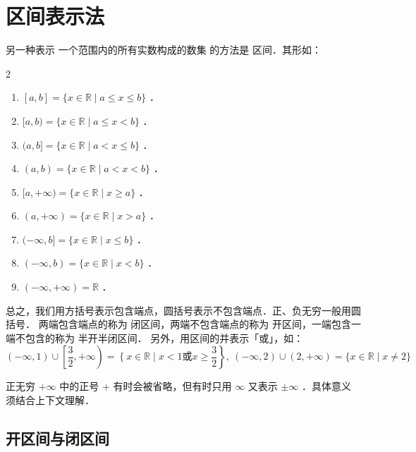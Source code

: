 \section{区间表示法}

\begin{definition}[区间]
    另一种表示 一个范围内的所有实数构成的数集 的方法是 区间．其形如：
    \begin{multicols}{2}
        \begin{enumerate}
            \item $[a, b]=\{x \in \mathbb{R} \mid a \leq x \leq b\}$ ．
            \item $[a, b)=\{x \in \mathbb{R} \mid a \leq x<b\}$ ．
            \item $(a, b]=\{x \in \mathbb{R} \mid a<x \leq b\}$ ．
            \item $(a, b)=\{x \in \mathbb{R} \mid a<x<b\}$ ．
            \item $[a,+\infty)=\{x \in \mathbb{R} \mid x \geq a\}$ ．
            \item $(a,+\infty)=\{x \in \mathbb{R} \mid x>a\}$ ．
            \item $(-\infty, b]=\{x \in \mathbb{R} \mid x \leq b\}$ ．
            \item $(-\infty, b)=\{x \in \mathbb{R} \mid x<b\}$ ．
            \item $(-\infty,+\infty)=\mathbb{R}$ ．
        \end{enumerate}
    \end{multicols}

    总之，我们用方括号表示包含端点，圆括号表示不包含端点．正、负无穷一般用圆括号．
    两端包含端点的称为 闭区间，两端不包含端点的称为 开区间，一端包含一端不包含的称为 半开半闭区间．
    另外，用区间的并表示「或」，如：
    $$(-\infty, 1) \cup\left[\frac{3}{2},+\infty\right)=\left\{x \in \mathbb{R} \mid x<1\right. \text{或} \left.x \geq \frac{3}{2}\right\}, ~(-\infty, 2) \cup (2,+\infty)=\{x \in \mathbb{R} \mid x \neq 2\}$$
    \begin{tips}
        正无穷 $+\infty$ 中的正号 + 有时会被省略，但有时只用 $\infty$ 又表示 $\pm \infty$ ．具体意义须结合上下文理解．
    \end{tips}
\end{definition}

\subsection{开区间与闭区间}

